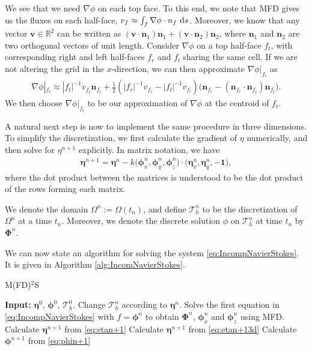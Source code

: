 \documentclass[11pt]{article}
\begin{document}
We see that we need $\nabla \phi$ on each top face. To this end, we note that MFD gives us the fluxes on each half-face, $v_{f} \approx \int_{f} \nabla \phi \cdot n_{f} \, \operatorname{d}\! s$.
Moreover, we know that any vector $\bm{v} \in \mathbb{R}^2$ can be written as $(\bm{v}\cdot\bm{n}_1) \bm{n}_1 + (\bm{v}\cdot\bm{n}_2) \bm{n}_2$,
where $\bm{n}_1$ and $\bm{n}_2$ are two orthogonal vectors of unit length.
Consider $\nabla \phi$ on a top half-face $f_t$, with corresponding right and left half-faces $f_r$ and $f_l$ sharing the same cell.
If we are not altering the grid in the $x$-direction, we can then approximate $\nabla \phi|_{f_t}$ as
\begin{align*}
    \nabla \phi|_{f_t} \approx |f_t|^{-1} v_{f_t} \bm{n}_{f_t} + \frac{1}{2}(|f_r|^{-1}v_{f_r}-|f_l|^{-1}v_{f_l})\big(\bm{n}_{f_r} - (\bm{n}_{f_r} \cdot \bm{n}_{f_t})\bm{n}_{f_t}\big).
\end{align*}
We then choose $\nabla \phi|_{f_t}$ to be our approximation of $\nabla \phi$ at the centroid of $f_t$.

A natural next step is now to implement the same procedure in three dimensions. To simplify the discretization, we first calculate
the gradient of $\eta$ numerically, and then solve for $\eta^{n+1}$ explicitly. In matrix notation, we have
\begin{align}
    \label{eq:etan+13d}
    \bm{\eta}^{n+1} = \bm{\eta}^n - k \big(\bm{\phi}_x^n, \bm{\phi}_y^n, \bm{\phi}_z^n\big)\cdot(\bm{\eta}_x^n, \bm{\eta}_y^n, -\bm{1}\big),
\end{align}
where the dot product between the matrices is understood to be the dot product of the rows forming each matrix.

We denote the domain $\Omega^n := \Omega(t_n)$, and define $\mathcal{T}_h^n$ to be the discretization of $\Omega^n$
at a time $t_n$. Moreover, we denote the discrete solution $\phi$ on $\mathcal{T}_h^n$ at time $t_n$ by $\bm{\Phi}^n$.

We can now state an algorithm for solving the system \eqref{eq:IncompNavierStokes}. It is given in Algorithm \eqref{alg:IncomNavierStokes}.
%
%
\begin{algorithm}
    \caption{M(FD)$^2$S}
    \begin{algorithmic}[1]
    \State    \textbf{Input:} $\bm{\eta}^0$, $\bm{\phi}^0$, $\mathcal{T}_h^0$.
	    \State    Change $\mathcal{T}_h^n$ according to $\bm{\eta}^n$.
            \State    Solve the first equation in \eqref{eq:IncompNavierStokes} with $f = \bm{\phi}^n$ to obtain
                      $\bm{\Phi}^{n}$, $\bm{\phi}_x^n$ and $\bm{\phi}_z^n$ using MFD.
                \State    Calculate $\bm{\eta}^{n+1}$ from \eqref{eq:etan+1}
			    \State    Calculate $\bm{\eta}^{n+1}$ from \eqref{eq:etan+13d}
			\EndIf
        \State    Calculate $\bm{\phi}^{n+1}$ from \eqref{eq:phin+1}
        \EndFor
	\end{algorithmic}
	\label{alg:IncomNavierStokes}
\end{algorithm}
%
%
\end{document}
